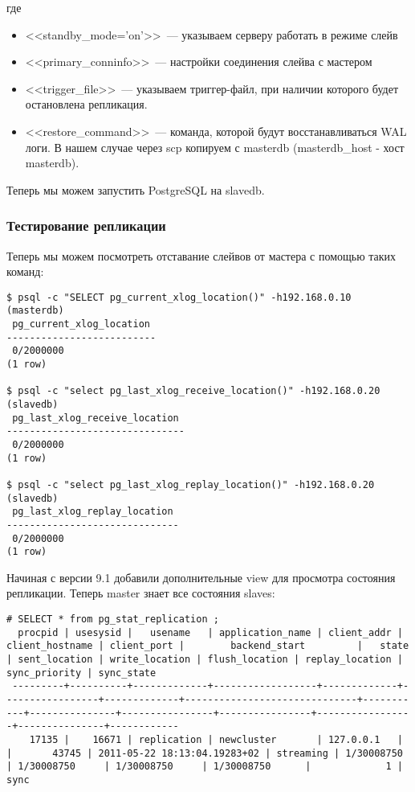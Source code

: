 где
\begin{itemize}
\item <<standby\_mode='on'>>~--- указываем серверу работать в режиме слейв
\item <<primary\_conninfo>>~--- настройки соединения слейва с мастером
\item <<trigger\_file>>~--- указываем триггер-файл, при наличии которого будет остановлена репликация.
\item <<restore\_command>>~--- команда, которой будут восстанавливаться WAL логи. В нашем случае через 
scp копируем с masterdb (masterdb\_host - хост masterdb).
\end{itemize}

Теперь мы можем запустить PostgreSQL на slavedb.

\subsubsection{Тестирование репликации}
Теперь мы можем посмотреть отставание слейвов от мастера с помощью таких команд:
\begin{lstlisting}[label=lst:streaming15,caption=Тестирование репликации]
$ psql -c "SELECT pg_current_xlog_location()" -h192.168.0.10 (masterdb)
 pg_current_xlog_location 
--------------------------
 0/2000000
(1 row)

$ psql -c "select pg_last_xlog_receive_location()" -h192.168.0.20 (slavedb)
 pg_last_xlog_receive_location 
-------------------------------
 0/2000000
(1 row)

$ psql -c "select pg_last_xlog_replay_location()" -h192.168.0.20 (slavedb)
 pg_last_xlog_replay_location 
------------------------------
 0/2000000
(1 row)
\end{lstlisting}

Начиная с версии 9.1 добавили дополнительные view для просмотра состояния репликации. Теперь master знает все состояния slaves:

\begin{lstlisting}[label=lst:streaming151,caption=Состояние слейвов]
# SELECT * from pg_stat_replication ;
  procpid | usesysid |   usename   | application_name | client_addr | client_hostname | client_port |        backend_start         |   state   | sent_location | write_location | flush_location | replay_location | sync_priority | sync_state 
 ---------+----------+-------------+------------------+-------------+-----------------+-------------+------------------------------+-----------+---------------+----------------+----------------+-----------------+---------------+------------
    17135 |    16671 | replication | newcluster       | 127.0.0.1   |                 |       43745 | 2011-05-22 18:13:04.19283+02 | streaming | 1/30008750    | 1/30008750     | 1/30008750     | 1/30008750      |             1 | sync
\end{lstlisting}

